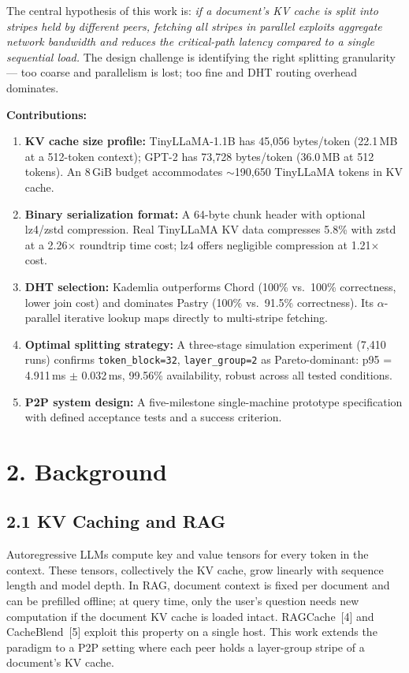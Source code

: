 \documentclass[11pt]{article}
\providecommand{\tightlist}{%
  \setlength{\itemsep}{0pt}\setlength{\parskip}{0pt}}
\begin{document}
The central hypothesis of this work is: \emph{if a document's KV cache
is split into stripes held by different peers, fetching all stripes in
parallel exploits aggregate network bandwidth and reduces the
critical-path latency compared to a single sequential load.} The design
challenge is identifying the right splitting granularity --- too coarse
and parallelism is lost; too fine and DHT routing overhead dominates.

\textbf{Contributions:}

\begin{enumerate}
\tightlist
\item
  \textbf{KV cache size profile:} TinyLLaMA-1.1B has 45,056 bytes/token
  (22.1\,MB at a 512-token context); GPT-2 has 73,728 bytes/token (36.0\,MB
  at 512 tokens). An 8\,GiB budget accommodates $\sim$190,650
  TinyLLaMA tokens in KV cache.
\item
  \textbf{Binary serialization format:} A 64-byte chunk header with
  optional lz4/zstd compression. Real TinyLLaMA KV data compresses 5.8\%
  with zstd at a 2.26$\times$ roundtrip time cost; lz4 offers negligible
  compression at 1.21$\times$ cost.
\item
  \textbf{DHT selection:} Kademlia outperforms Chord (100\% vs.\ 100\%
  correctness, lower join cost) and dominates Pastry (100\% vs.\ 91.5\%
  correctness). Its $\alpha$-parallel iterative lookup maps directly to
  multi-stripe fetching.
\item
  \textbf{Optimal splitting strategy:} A three-stage simulation
  experiment (7,410 runs) confirms
  \texttt{token\_block=32}, \texttt{layer\_group=2} as Pareto-dominant: p95 =
  4.911\,ms $\pm$ 0.032\,ms, 99.56\% availability, robust across all tested
  conditions.
\item
  \textbf{P2P system design:} A five-milestone single-machine prototype
  specification with defined acceptance tests and a success criterion.
\end{enumerate}

\section{2. Background}

\subsection{2.1 KV Caching and RAG}

Autoregressive LLMs compute key and value tensors for every token in the
context. These tensors, collectively the KV cache, grow linearly with
sequence length and model depth. In RAG, document context is fixed per
document and can be prefilled offline; at query time, only the user's
question needs new computation if the document KV cache is loaded
intact. RAGCache~[4] and CacheBlend~[5] exploit this property on a
single host. This work extends the paradigm to a P2P setting where each
peer holds a layer-group stripe of a document's KV cache.
\end{document}
